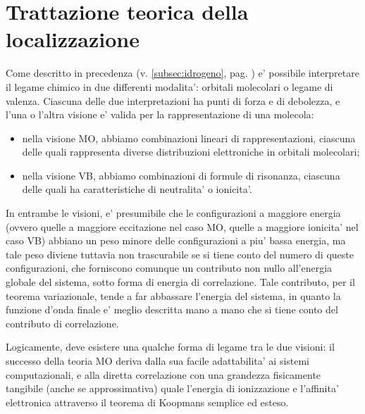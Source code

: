 \chapter{Trattazione teorica della localizzazione}

Come descritto in precedenza (v. \ref{subsec:idrogeno}, pag. \pageref{subsec:idrogeno}) e' possibile
interpretare il legame chimico in due differenti modalita': orbitali molecolari o legame di valenza.
Ciascuna delle due interpretazioni ha punti di forza e di debolezza, e l'una o l'altra visione
e' valida per la rappresentazione di una molecola: 

\begin{itemize}
\item nella visione MO, abbiamo combinazioni lineari di rappresentazioni, ciascuna delle quali 
rappresenta diverse distribuzioni elettroniche in orbitali molecolari; 

\item nella visione VB, abbiamo combinazioni di formule di risonanza, ciascuna delle quali ha caratteristiche
di neutralita' o ionicita'.
\end{itemize}

In entrambe le visioni, e' presumibile che le configurazioni a maggiore energia (ovvero quelle a
maggiore eccitazione nel caso MO, quelle a maggiore ionicita' nel caso VB) abbiano un peso minore
delle configurazioni a piu' bassa energia, ma tale peso diviene tuttavia non trascurabile se si
tiene conto del numero di queste configurazioni, che forniscono comunque un contributo non nullo
all'energia globale del sistema, sotto forma di energia di correlazione. Tale contributo, per
il teorema variazionale, tende a far abbassare l'energia del sistema, in quanto la funzione
d'onda finale e' meglio descritta mano a mano che si tiene conto del contributo di correlazione.

Logicamente, deve esistere una qualche forma di legame tra le due visioni: il successo
della teoria MO deriva dalla sua facile adattabilita' ai sistemi computazionali, e alla diretta
correlazione con una grandezza fisicamente tangibile (anche se approssimativa) quale l'energia
di ionizzazione e l'affinita' elettronica attraverso il teorema di Koopmans semplice ed esteso.


